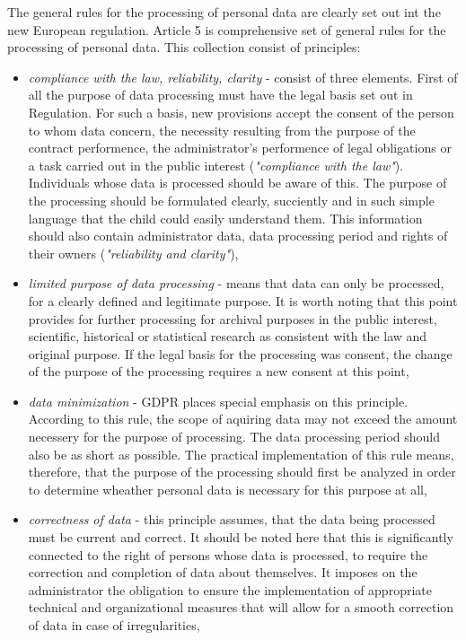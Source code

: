 \documentclass[en, noamssymb]{mgr}
\begin{document}
The general rules for the processing of personal data are clearly set out int the new European regulation. Article 5 is comprehensive set of general rules for the processing of personal data. This collection consist of principles:
\begin{itemize}

\item \textit{compliance with the law, reliability, clarity} - consist of three elements. First of all the purpose of data processing must have the legal basis set out in Regulation. For such a basis, new provisions accept the consent of the person to whom data concern, the necessity resulting from the purpose of the contract performence, the administrator's performence of legal obligations or a task carried out in the public interest (\textit{"compliance with the law"}). Individuals whose data is processed should be aware of this. The purpose of the processing should be formulated clearly, succiently and in such simple language that the child could easily understand them. This information should also contain administrator data, data processing period and rights of their owners (\textit{"reliability and clarity"}),

\item \textit{limited purpose of data processing} - means that data can only be processed, for a clearly defined and legitimate purpose. It is worth noting that this point provides for further processing for archival purposes in the public interest, scientific, historical or statistical research as consistent with the law and original purpose. If the legal basis for the processing was consent, the change of the purpose of the processing requires a new consent at this point,

\item \textit{data minimization} - GDPR places special emphasis on this principle. According to this rule, the scope of aquiring data may not exceed the amount necessery for the purpose of processing. The data processing period should also be as short as possible. The practical implementation of this rule means, therefore, that the purpose of the processing should first be analyzed in order to determine wheather personal data is necessary for this purpose at all,

\item \textit{correctness of data} - this principle assumes, that the data being processed must be current and correct. It should be noted here that this is significantly connected to the right of persons whose data is processed, to require the correction and completion of data about themselves. It imposes on the administrator the obligation to ensure the implementation of appropriate technical and organizational measures that will allow for a smooth correction of data in case of irregularities,


\end{itemize}
\end{document}
